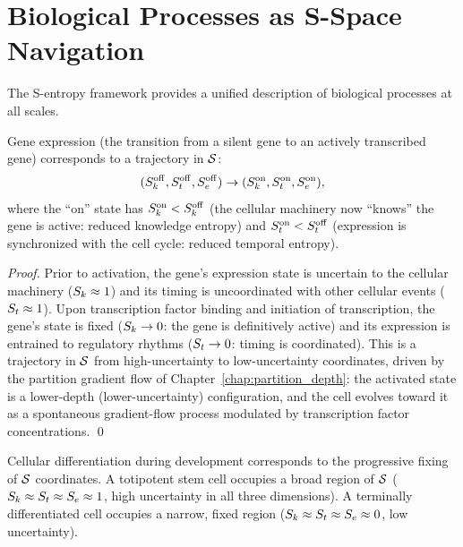 \section{Biological Processes as S-Space Navigation}
\label{sec:biology_as_navigation}

The S-entropy framework provides a unified description of biological processes
at all scales.

\begin{proposition}
\label{prop:gene_expression}
Gene expression (the transition from a silent gene to an actively transcribed
gene) corresponds to a trajectory in $\mathcal{S}$:
\begin{equation}
  (S_k^{\mathrm{off}}, S_t^{\mathrm{off}}, S_e^{\mathrm{off}}) \to
  (S_k^{\mathrm{on}}, S_t^{\mathrm{on}}, S_e^{\mathrm{on}}),
\end{equation}
where the ``on'' state has $S_k^{\mathrm{on}} < S_k^{\mathrm{off}}$
(the cellular machinery now ``knows'' the gene is active: reduced knowledge
entropy) and $S_t^{\mathrm{on}} < S_t^{\mathrm{off}}$ (expression is
synchronized with the cell cycle: reduced temporal entropy).
\end{proposition}

\begin{proof}
Prior to activation, the gene's expression state is uncertain to the cellular
machinery ($S_k \approx 1$) and its timing is uncoordinated with other
cellular events ($S_t \approx 1$). Upon transcription factor binding and
initiation of transcription, the gene's state is fixed ($S_k \to 0$: the
gene is definitively active) and its expression is entrained to regulatory
rhythms ($S_t \to 0$: timing is coordinated). This is a trajectory in $\mathcal{S}$
from high-uncertainty to low-uncertainty coordinates, driven by the partition
gradient flow of Chapter~\ref{chap:partition_depth}: the activated state is a
lower-depth (lower-uncertainty) configuration, and the cell evolves toward it
as a spontaneous gradient-flow process modulated by transcription factor
concentrations. \qed
\end{proof}

\begin{proposition}
\label{prop:differentiation}
Cellular differentiation during development corresponds to the progressive
fixing of $\mathcal{S}$ coordinates. A totipotent stem cell occupies a broad
region of $\mathcal{S}$ ($S_k \approx S_t \approx S_e \approx 1$, high uncertainty
in all three dimensions). A terminally differentiated cell occupies a narrow,
fixed region ($S_k \approx S_t \approx S_e \approx 0$, low uncertainty).
\end{proposition}

